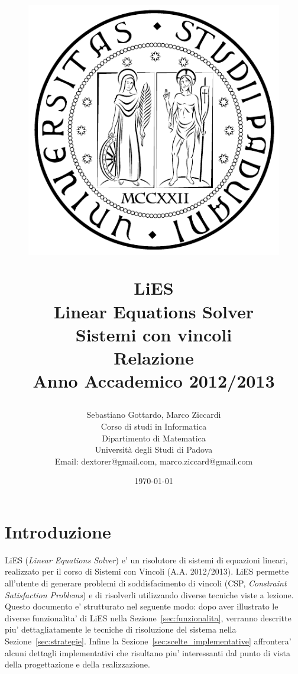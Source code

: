 \documentclass[10pt, a4paper]{article}
\title{
\begin{figure}[ht]
\begin{center}
\includegraphics[scale=0.6]{./common-images/unipd_logo.pdf}
\end{center}
\end{figure}
LiES \\ Linear Equations Solver \\ Sistemi con vincoli \\\vspace{10mm} \textbf{Relazione}\\\vspace{0.4cm}
\Large{Anno Accademico 2012/2013}}
\author{Sebastiano Gottardo, Marco Ziccardi\\
Corso di studi in Informatica\\
Dipartimento di Matematica\\
Università degli Studi di Padova\\
Email: dextorer@gmail.com, marco.ziccard@gmail.com }
\date{\today} %
\begin{document}
\maketitle %



\newpage
\tableofcontents
\newpage


\section{Introduzione}
\label{sec:introduzione}

LiES (\textit{Linear Equations Solver}) e' un risolutore di sistemi di equazioni lineari, realizzato per il corso di Sistemi con Vincoli (A.A. 2012/2013). LiES permette all'utente di generare problemi di soddisfacimento di vincoli (CSP, \textit{Constraint Satisfaction Problems}) e di risolverli utilizzando diverse tecniche viste a lezione.\\

Questo documento e' strutturato nel seguente modo: dopo aver illustrato le diverse funzionalita' di LiES nella Sezione~\ref{sec:funzionalita}, verranno descritte piu' dettagliatamente le tecniche di risoluzione del sistema nella Sezione~\ref{sec:strategie}. Infine la Sezione~\ref{sec:scelte_implementative} affrontera' alcuni dettagli implementativi che risultano piu' interessanti dal punto di vista della progettazione e della realizzazione.

\end{document}
